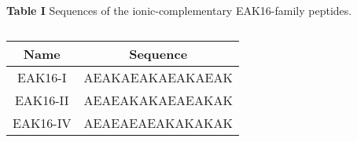 \documentclass[preprint,preprintnumbers,amsmath,amssymb,showpacs,aps,pre]{revtex4-1}
\begin{document}
\vspace{0.5cm}
\parindent 0pt {\large {\bf Table I}}
Sequences of the ionic-complementary EAK16-family peptides.

\newpage

\begin{table}
  \centering
  \caption{}
  \begin{tabular}[t]{c|c}
    \hline
     Name & Sequence \\
    \hline
     EAK16-I  & AEAKAEAKAEAKAEAK \\
     EAK16-II & AEAEAKAKAEAEAKAK \\
     EAK16-IV & AEAEAEAEAKAKAKAK \\
    \hline
  \end{tabular}
\end{table}

\end{document}
